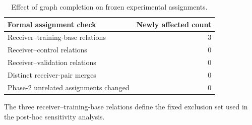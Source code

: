\begin{table}[t]
\caption{Effect of graph completion on frozen experimental assignments.}
\label{tab:formal-assignment-impact}
\centering
\scriptsize
\begin{tabular}{lr}
\toprule
Formal assignment check & Newly affected count \\
\midrule
Receiver--training-base relations & 3 \\
Receiver--control relations & 0 \\
Receiver--validation relations & 0 \\
Distinct receiver-pair merges & 0 \\
Phase-2 unrelated assignments changed & 0 \\
\bottomrule
\end{tabular}
\vspace{2pt}
\begin{minipage}{\columnwidth}
\footnotesize The three receiver--training-base relations define the fixed exclusion set used in the post-hoc sensitivity analysis.
\end{minipage}
\end{table}
